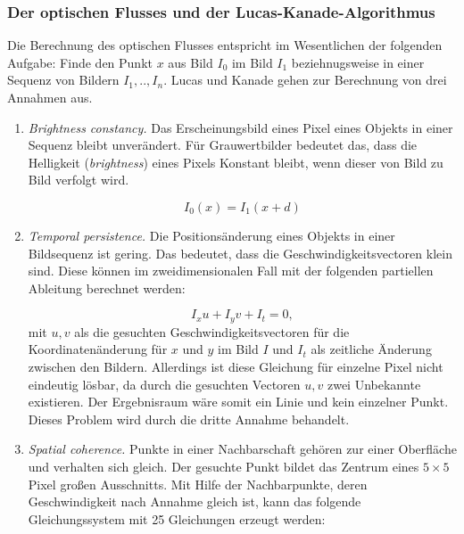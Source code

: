	\subsubsection{Der optischen Flusses und der Lucas-Kanade-Algorithmus}
	Die Berechnung des optischen Flusses entspricht im Wesentlichen der folgenden Aufgabe: Finde den Punkt $x$ aus Bild $I_{0}$ im Bild $I_{1}$ beziehnugsweise in einer Sequenz von Bildern $I_{1},..,I_{n}$. Lucas und Kanade gehen zur Berechnung von drei Annahmen aus.

	\begin{enumerate}
	\item \textit{Brightness constancy.} Das Erscheinungsbild eines Pixel eines Objekts in einer Sequenz bleibt unverändert. Für Grauwertbilder bedeutet das, dass die Helligkeit (\textit{brightness}) eines Pixels Konstant bleibt, wenn dieser von Bild zu Bild verfolgt wird.

	\begin{equation}
	I_{0}(x)=I_{1}(x+d)
	\end{equation}

	\item \textit{Temporal persistence. }Die Positionsänderung eines Objekts in einer Bildsequenz ist gering. Das bedeutet, dass die Geschwindigkeitsvectoren klein sind. Diese können im zweidimensionalen Fall mit der folgenden partiellen Ableitung berechnet werden:

	\begin{equation} I_{x}u+I_{y}v+I_{t}=0, \end{equation}
	mit $u,v$ als die gesuchten Geschwindigkeitsvectoren für die Koordinatenänderung für $x$ und $y$ im Bild $I$ und $I_{t}$ als zeitliche Änderung zwischen den Bildern. Allerdings ist diese Gleichung für einzelne Pixel nicht eindeutig lösbar, da durch die gesuchten Vectoren $u,v$ zwei Unbekannte existieren. Der Ergebnisraum wäre somit ein Linie und kein einzelner Punkt. Dieses Problem wird durch die dritte Annahme behandelt.

	\item \textit{Spatial coherence.} Punkte in einer Nachbarschaft gehören zur einer Oberfläche und verhalten sich gleich. Der gesuchte Punkt bildet das Zentrum eines $5\times5$ Pixel großen Ausschnitts.
	Mit Hilfe der Nachbarpunkte, deren Geschwindigkeit nach Annahme gleich ist, kann das folgende Gleichungssystem mit 25 Gleichungen erzeugt werden:


\end{enumerate}
